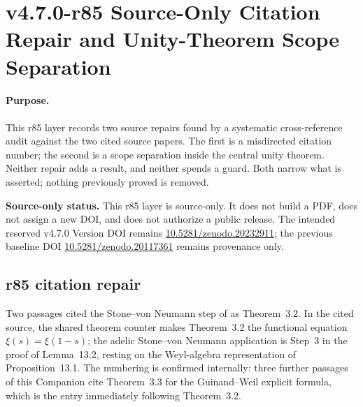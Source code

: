 
\clearpage
\section*{v4.7.0-r85 Source-Only Citation Repair and Unity-Theorem Scope Separation}
\label{sec:r85-citation-repair-unity-scope-separation}

\paragraph{Purpose.}
This r85 layer records two source repairs found by a systematic cross-reference audit
against the two cited source papers.  The first is a misdirected citation number; the second
is a scope separation inside the central unity theorem.  Neither repair adds a result, and
neither spends a guard.  Both narrow what is asserted; nothing previously proved is removed.

\noindent\textbf{Source-only status.}
This r85 layer is source-only.  It does not build a PDF, does not assign a new DOI, and does
not authorize a public release.  The intended reserved v4.7.0 Version DOI remains
\href{https://doi.org/10.5281/zenodo.20232911}{10.5281/zenodo.20232911}; the previous
baseline DOI \href{https://doi.org/10.5281/zenodo.20117361}{10.5281/zenodo.20117361}
remains provenance only.

\subsection*{r85 citation repair}
\label{subsec:r85-citation-repair}

Two passages cited the Stone--von Neumann step of \cite{brendecke2026rh} as Theorem~3.2.
In the cited source, the shared theorem counter makes Theorem~3.2 the functional equation
\(\xi(s)=\xi(1-s)\); the adelic Stone--von Neumann application is Step~3 in the proof of
Lemma~13.2, resting on the Weyl-algebra representation of Proposition~13.1.  The numbering is
confirmed internally: three further passages of this Companion cite Theorem~3.3 for the
Guinand--Weil explicit formula, which is the entry immediately following Theorem~3.2.

